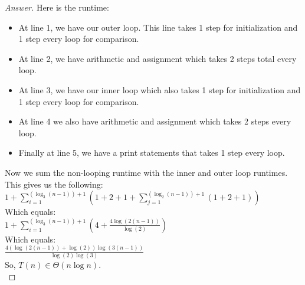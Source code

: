 \documentclass[11pt]{article}
\theoremstyle{definition}
\theoremstyle{definition}
\theoremstyle{definition}
\begin{document}
\begin{proof}[Answer]
	Here is the runtime:\\
\begin{itemize}[]
	\item At line 1, we have our outer loop. This line takes 1 step for initialization and 1 step every loop for comparison.\\
	
	\item At line 2, we have arithmetic and assignment which takes 2 steps total every loop.\\
	
	\item At line 3, we have our inner loop which also takes 1 step for initialization and 1 step every loop for comparison.\\
	
	\item At line 4 we also have arithmetic and assignment which takes 2 steps every loop.\\
	
	\item Finally at line 5, we have a print statements that takes 1 step every loop.\\ 
 \end{itemize}

\noindent Now we sum the non-looping runtime with the inner and outer loop runtimes.\\

\noindent This gives us the following: \\
$1 + \displaystyle\sum_{i=1} ^{(\log_3(n - 1)) + 1} (1 + 2 + 1 + \displaystyle\sum_{j=1} ^{(\log_2(n - 1)) + 1} (1 + 2 + 1))$\\

\noindent Which equals:\\
$1 + \displaystyle\sum_{i=1} ^{(\log_3(n - 1)) + 1} (4 + \frac{4\log(2(n-1))}{\log(2)})$\\

\noindent Which equals:\\
$\frac{4(\log(2(n-1)) + \log(2))\log(3(n - 1))}{\log(2)\log(3)}$\\

So, $T(n) \in \Theta(n \log n)$.\\

\end{proof}





\end{document}
